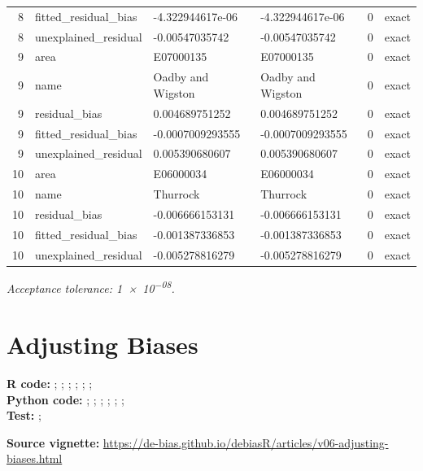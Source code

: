 \documentclass[10pt]{article}
\begin{document}
\begin{longtable}{@{}r p{}p{}p{}rl@{}}
8 & fitted\_\allowbreak{}residual\_\allowbreak{}bias & -4.322944617e-06 & -4.322944617e-06 & 0 & exact \\
8 & unexplained\_\allowbreak{}residual & -0.00547035742 & -0.00547035742 & 0 & exact \\
9 & area & E07000135 & E07000135 & 0 & exact \\
9 & name & Oadby and Wigston & Oadby and Wigston & 0 & exact \\
9 & residual\_\allowbreak{}bias & 0.004689751252 & 0.004689751252 & 0 & exact \\
9 & fitted\_\allowbreak{}residual\_\allowbreak{}bias & -0.0007009293555 & -0.0007009293555 & 0 & exact \\
9 & unexplained\_\allowbreak{}residual & 0.005390680607 & 0.005390680607 & 0 & exact \\
10 & area & E06000034 & E06000034 & 0 & exact \\
10 & name & Thurrock & Thurrock & 0 & exact \\
10 & residual\_\allowbreak{}bias & -0.006666153131 & -0.006666153131 & 0 & exact \\
10 & fitted\_\allowbreak{}residual\_\allowbreak{}bias & -0.001387336853 & -0.001387336853 & 0 & exact \\
10 & unexplained\_\allowbreak{}residual & -0.005278816279 & -0.005278816279 & 0 & exact \\
\bottomrule
\end{longtable}
\normalsize
\textit{Acceptance tolerance: \num{1e-08}.}

\section{Adjusting Biases}
{\footnotesize \textbf{R code:} ; ; ; ; ; ; \\ \textbf{Python code:} ; ; ; ; ; ; \\ \textbf{Test:} ; \par}


\textbf{Source vignette:} \url{https://de-bias.github.io/debiasR/articles/v06-adjusting-biases.html}
\end{document}
